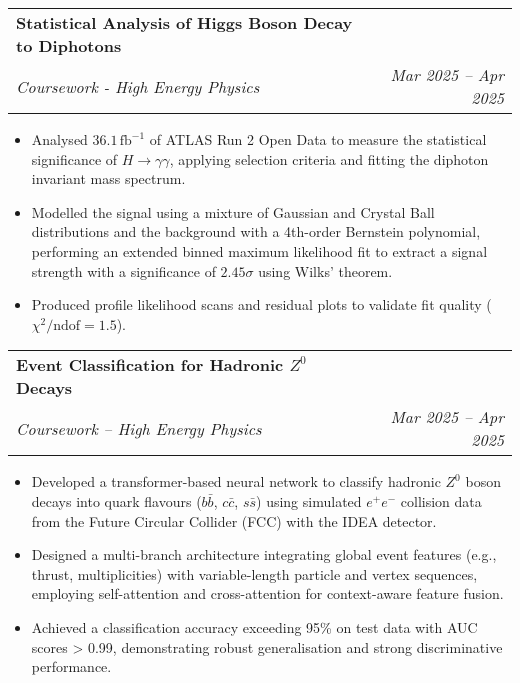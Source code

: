 \documentclass[a4paper,11pt]{article}
\makeatletter
\newcommand{\resumeItem}[1]{
  \item\small{
    {#1 \vspace{-2pt}}
  }
}
\newcommand{\resumeSubheading}[4]{
  \vspace{-2pt}\item
    \begin{tabular*}{0.97\textwidth}[t]{l@{\extracolsep{\fill}}r}
      \textbf{#1} & #2 \\
      \textit{\small#3} & \textit{\small #4} \\
    \end{tabular*}\vspace{-7pt}
}
\newcommand{\resumeItemListStart}{\begin{itemize}}
\newcommand{\resumeItemListEnd}{\end{itemize}\vspace{-5pt}}
\makeatother
\begin{document}


\resumeSubheading
    {Statistical Analysis of Higgs Boson Decay to Diphotons}{}
    {Coursework - High Energy Physics}{Mar 2025 -- Apr 2025}
    \resumeItemListStart
      \resumeItem{Analysed \( 36.1 \, \text{fb}^{-1} \) of ATLAS Run 2 Open Data to measure the statistical significance of \( H \rightarrow \gamma \gamma \), applying selection criteria and fitting the diphoton invariant mass spectrum.}
      \resumeItem{Modelled the signal using a mixture of Gaussian and Crystal Ball distributions and the background with a 4th-order Bernstein polynomial, performing an extended binned maximum likelihood fit to extract a signal strength with a significance of \( 2.45 \sigma \) using Wilks' theorem.}
      \resumeItem{Produced profile likelihood scans and residual plots to validate fit quality (\( \chi^2 / \text{ndof} = 1.5 \)).}
    \resumeItemListEnd


  \resumeSubheading
    {Event Classification for Hadronic \( Z^0 \) Decays}{}
    {Coursework -- High Energy Physics}{Mar 2025 -- Apr 2025}
    \resumeItemListStart
        \resumeItem{Developed a transformer-based neural network to classify hadronic \( Z^0 \) boson decays into quark flavours (\( b \bar{b} \), \( c \bar{c} \), \( s \bar{s} \)) using simulated \( e^+ e^- \) collision data from the Future Circular Collider (FCC) with the IDEA detector.}
        \resumeItem{Designed a multi-branch architecture integrating global event features (e.g., thrust, multiplicities) with variable-length particle and vertex sequences, employing self-attention and cross-attention for context-aware feature fusion.}
        \resumeItem{Achieved a classification accuracy exceeding 95\% on test data with AUC scores > 0.99, demonstrating robust generalisation and strong discriminative performance.}
    \resumeItemListEnd
\end{document}
